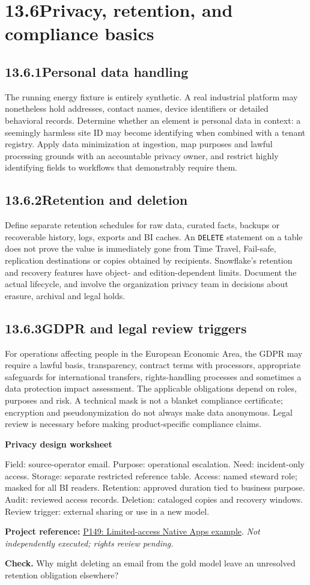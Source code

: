 \documentclass[11pt,twoside]{article}
\newcommand{\topic}[2]{\subsection*{#1\quad #2}}
\newcommand{\repo}[2]{\par\begingroup\fontsize{8.0}{9.6}\selectfont\sffamily\color{inkgray}\textbf{Project reference:} \href{#2}{#1}. \textit{Not independently executed; rights review pending.}\par\endgroup}
\begin{document}
\section*{13.6\quad Privacy, retention, and compliance basics}
\topic{13.6.1}{Personal data handling}
The running energy fixture is entirely synthetic. A real industrial platform may nonetheless hold addresses, contact names, device identifiers or detailed behavioral records. Determine whether an element is personal data in context: a seemingly harmless site ID may become identifying when combined with a tenant registry. Apply data minimization at ingestion, map purposes and lawful processing grounds with an accountable privacy owner, and restrict highly identifying fields to workflows that demonstrably require them.
\topic{13.6.2}{Retention and deletion}
Define separate retention schedules for raw data, curated facts, backups or recoverable history, logs, exports and BI caches. An \texttt{DELETE} statement on a table does not prove the value is immediately gone from Time Travel, Fail-safe, replication destinations or copies obtained by recipients. Snowflake's retention and recovery features have object- and edition-dependent limits. Document the actual lifecycle, and involve the organization privacy team in decisions about erasure, archival and legal holds.
\topic{13.6.3}{GDPR and legal review triggers}
For operations affecting people in the European Economic Area, the GDPR may require a lawful basis, transparency, contract terms with processors, appropriate safeguards for international transfers, rights-handling processes and sometimes a data protection impact assessment. The applicable obligations depend on roles, purposes and risk. A technical mask is not a blanket compliance certificate; encryption and pseudonymization do not always make data anonymous. Legal review is necessary before making product-specific compliance claims.
\begin{whitebox}\textbf{Privacy design worksheet}\par
Field: source-operator email. Purpose: operational escalation. Need: incident-only access. Storage: separate restricted reference table. Access: named steward role; masked for all BI readers. Retention: approved duration tied to business purpose. Audit: reviewed access records. Deletion: cataloged copies and recovery windows. Review trigger: external sharing or use in a new model.
\end{whitebox}
\repo{P149: Limited-access Native Apps example}{https://github.com/Snowflake-Labs/sfguide-native-apps-limited-access-data}
\textbf{Check.} Why might deleting an email from the gold model leave an unresolved retention obligation elsewhere?
\newpage
\end{document}
